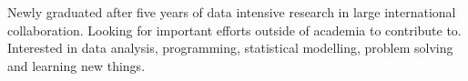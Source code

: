 

\begin{cvparagraph}

Newly graduated after five years of data intensive research in large international collaboration. 
Looking for important efforts outside of academia to contribute to.
Interested in data analysis, programming, statistical modelling, problem solving and learning new things. 

\end{cvparagraph}